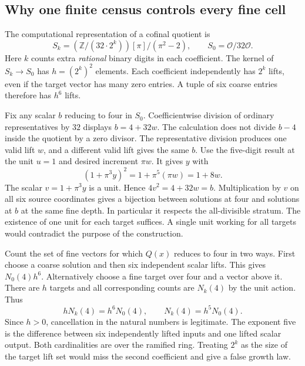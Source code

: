 \documentclass[12pt,letterpaper]{article}
\begin{document}
\subsection{Why one finite census controls every fine cell}
The computational representation of a cofinal quotient is
\[
 S_k=(\mathbb Z/(32\cdot2^k)) [\pi]/(\pi^2-2),\qquad S_0=\mathcal O/32\mathcal O.
\]
Here $k$ counts extra \emph{rational} binary digits in each coefficient. The kernel of $S_k\to S_0$ has $h=(2^k)^2$ elements. Each coefficient independently has $2^k$ lifts, even if the target vector has many zero entries. A tuple of six coarse entries therefore has $h^6$ lifts.
\par
Fix any scalar $b$ reducing to four in $S_0$. Coefficientwise division of ordinary representatives by $32$ displays $b=4+32w$. The calculation does not divide $b-4$ inside the quotient by a zero divisor. The representative division produces one valid lift $w$, and a different valid lift gives the same $b$. Use the five-digit result at the unit $u=1$ and desired increment $\pi w$. It gives $y$ with
\[
 (1+\pi^3y)^2=1+\pi^5(\pi w)=1+8w.
\]
The scalar $v=1+\pi^3y$ is a unit. Hence $4v^2=4+32w=b$. Multiplication by $v$ on all six source coordinates gives a bijection between solutions at four and solutions at $b$ at the same fine depth. In particular it respects the all-divisible stratum. The existence of one unit for each target suffices. A single unit working for all targets would contradict the purpose of the construction.
\par
Count the set of fine vectors for which $Q(x)$ reduces to four in two ways. First choose a coarse solution and then six independent scalar lifts. This gives $N_0(4)h^6$. Alternatively choose a fine target over four and a vector above it. There are $h$ targets and all corresponding counts are $N_k(4)$ by the unit action. Thus
\[
         hN_k(4)=h^6N_0(4),\qquad N_k(4)=h^5 N_0(4).
\]
Since $h>0$, cancellation in the natural numbers is legitimate. The exponent five is the difference between six independently lifted inputs and one lifted scalar output. Both cardinalities are over the ramified ring. Treating $2^k$ as the size of the target lift set would miss the second coefficient and give a false growth law.
\end{document}
